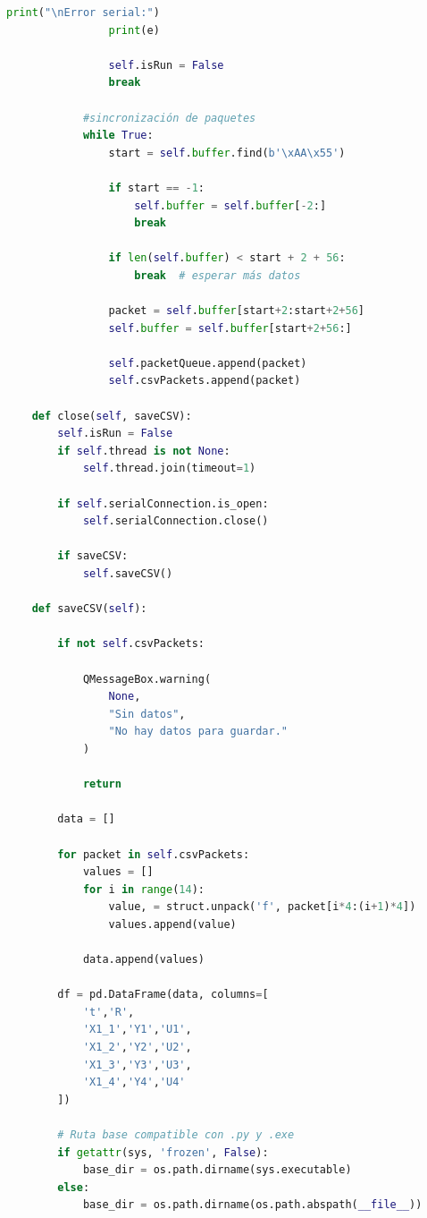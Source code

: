 \documentclass[12pt,letterpaper,twoside]{article}
\begin{document}
\begin{lstlisting}[language=Python]
                print("\nError serial:")
                print(e)
        
                self.isRun = False
                break
    
            #sincronización de paquetes
            while True:
                start = self.buffer.find(b'\xAA\x55')
    
                if start == -1:
                    self.buffer = self.buffer[-2:]
                    break
    
                if len(self.buffer) < start + 2 + 56:
                    break  # esperar más datos
    
                packet = self.buffer[start+2:start+2+56]
                self.buffer = self.buffer[start+2+56:]
    
                self.packetQueue.append(packet)
                self.csvPackets.append(packet)
            
    def close(self, saveCSV):
        self.isRun = False
        if self.thread is not None:
            self.thread.join(timeout=1)
        
        if self.serialConnection.is_open:
            self.serialConnection.close()

        if saveCSV:
            self.saveCSV()

    def saveCSV(self):

        if not self.csvPackets:
        
            QMessageBox.warning(
                None,
                "Sin datos",
                "No hay datos para guardar."
            )
        
            return
            
        data = []

        for packet in self.csvPackets:
            values = []
            for i in range(14):
                value, = struct.unpack('f', packet[i*4:(i+1)*4])
                values.append(value)

            data.append(values)

        df = pd.DataFrame(data, columns=[
            't','R',
            'X1_1','Y1','U1',
            'X1_2','Y2','U2',
            'X1_3','Y3','U3',
            'X1_4','Y4','U4'
        ])

        # Ruta base compatible con .py y .exe
        if getattr(sys, 'frozen', False):
            base_dir = os.path.dirname(sys.executable)
        else:
            base_dir = os.path.dirname(os.path.abspath(__file__))
        

\end{lstlisting}
\end{document}
